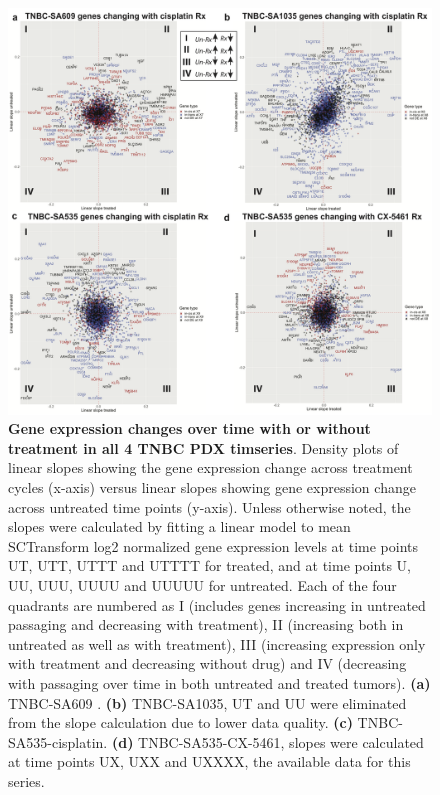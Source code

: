 \begin{figure}
\centering
 \includegraphics[width=\textwidth]{Figures/chap5/GeneschanginginRxclouds.png}
\caption[Gene expression changes over time with or without treatment in all 4 TNBC PDX timseries]
	{\small
	 \textbf{Gene expression changes over time with or without treatment in all 4 TNBC PDX timseries}.
Density plots of linear slopes showing the gene expression change across treatment cycles (x-axis) versus linear slopes showing gene expression change across untreated time points (y-axis). Unless otherwise noted, the slopes were calculated by fitting a linear model to mean SCTransform log2 normalized gene expression levels at time points UT, UTT, UTTT and UTTTT for treated, and at time points U, UU, UUU, UUUU and UUUUU for untreated. Each of the four quadrants are numbered as I (includes genes increasing in untreated passaging and decreasing with treatment), II (increasing both in untreated as well as with treatment), III (increasing expression only with treatment and decreasing without drug) and  IV (decreasing with passaging over time in both untreated and treated tumors).  \textbf{(a)} TNBC-SA609 . \textbf{(b)} TNBC-SA1035, UT and UU were eliminated from the slope calculation due to lower data quality. \textbf{(c)} TNBC-SA535-cisplatin. \textbf{(d)} TNBC-SA535-CX-5461, slopes were calculated at time points UX, UXX and UXXXX, the available data for this series.}

	\label{fig:GeneschanginginRxclouds}
\end{figure}

